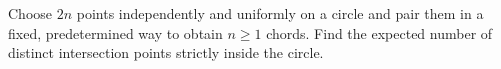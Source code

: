 Choose $2n$ points independently and uniformly on a circle and pair them in a fixed, predetermined way to obtain $n\ge1$ chords. Find the expected number of distinct intersection points strictly inside the circle.
